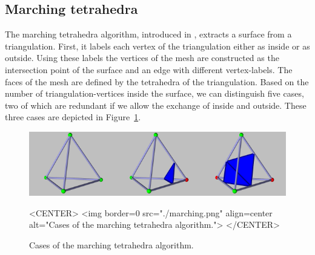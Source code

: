 


\subsection{Marching tetrahedra}
The marching tetrahedra algorithm, introduced in
\cite{cgal:tpg-rmtiise-99}, extracts a surface from a triangulation.
First, it labels each vertex of the triangulation either as inside or
as outside. Using these labels the vertices of the mesh are
constructed as the intersection point of the surface and an edge with
different vertex-labels. The faces of the mesh are defined by the
tetrahedra of the triangulation. Based on the number of
triangulation-vertices inside the surface, we can distinguish five
cases, two of which are redundant if we allow the exchange of inside
and outside. These three cases are depicted in
Figure~\ref{SkinSurface3-fig-marching}.

\begin{figure}
\begin{ccTexOnly}
\begin{center}
\includegraphics[width=\textwidth]{Skin_surface_3/marching}
\end{center}
\end{ccTexOnly}
\begin{ccHtmlOnly}
<CENTER>
<img border=0 src="./marching.png" align=center
alt="Cases of the marching tetrahedra algorithm.">
</CENTER>
\end{ccHtmlOnly}

\caption{\label{SkinSurface3-fig-marching} Cases of the marching
  tetrahedra algorithm.}
\end{figure}

